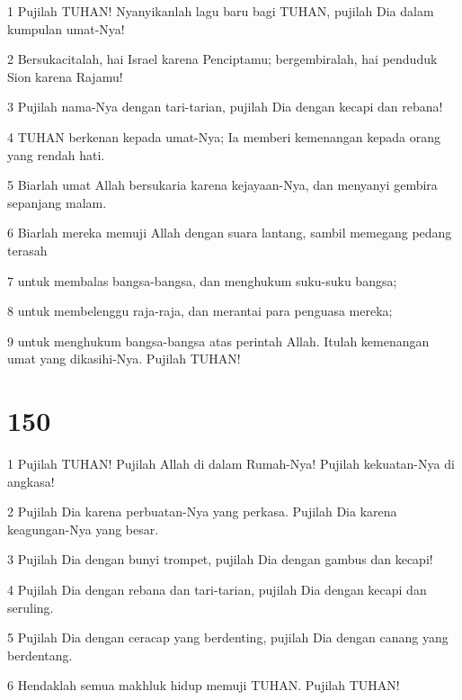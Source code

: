 \par 1 Pujilah TUHAN! Nyanyikanlah lagu baru bagi TUHAN, pujilah Dia dalam kumpulan umat-Nya!
\par 2 Bersukacitalah, hai Israel karena Penciptamu; bergembiralah, hai penduduk Sion karena Rajamu!
\par 3 Pujilah nama-Nya dengan tari-tarian, pujilah Dia dengan kecapi dan rebana!
\par 4 TUHAN berkenan kepada umat-Nya; Ia memberi kemenangan kepada orang yang rendah hati.
\par 5 Biarlah umat Allah bersukaria karena kejayaan-Nya, dan menyanyi gembira sepanjang malam.
\par 6 Biarlah mereka memuji Allah dengan suara lantang, sambil memegang pedang terasah
\par 7 untuk membalas bangsa-bangsa, dan menghukum suku-suku bangsa;
\par 8 untuk membelenggu raja-raja, dan merantai para penguasa mereka;
\par 9 untuk menghukum bangsa-bangsa atas perintah Allah. Itulah kemenangan umat yang dikasihi-Nya. Pujilah TUHAN!

\chapter{150}

\par 1 Pujilah TUHAN! Pujilah Allah di dalam Rumah-Nya! Pujilah kekuatan-Nya di angkasa!
\par 2 Pujilah Dia karena perbuatan-Nya yang perkasa. Pujilah Dia karena keagungan-Nya yang besar.
\par 3 Pujilah Dia dengan bunyi trompet, pujilah Dia dengan gambus dan kecapi!
\par 4 Pujilah Dia dengan rebana dan tari-tarian, pujilah Dia dengan kecapi dan seruling.
\par 5 Pujilah Dia dengan ceracap yang berdenting, pujilah Dia dengan canang yang berdentang.
\par 6 Hendaklah semua makhluk hidup memuji TUHAN. Pujilah TUHAN!


